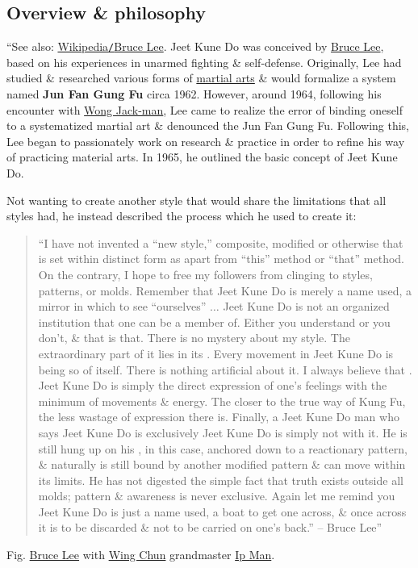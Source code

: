 \documentclass[oneside]{book}
\numberwithin{equation}{section}
\begin{document}
\subsection{Overview \& philosophy}
``See also: \href{https://en.wikipedia.org/wiki/Bruce_Lee}{Wikipedia\texttt{/}Bruce Lee}. Jeet Kune Do was conceived by \href{https://en.wikipedia.org/wiki/Bruce_Lee}{Bruce Lee}, based on his experiences in unarmed fighting \& self-defense. Originally, Lee had studied \& researched various forms of \href{https://en.wikipedia.org/wiki/Martial_arts}{martial arts} \& would formalize a system named \textbf{Jun Fan Gung Fu} circa 1962. However, around 1964, following his encounter with \href{https://en.wikipedia.org/wiki/Wong_Jack-man}{Wong Jack-man}, Lee came to realize the error of binding oneself to a systematized martial art \& denounced the Jun Fan Gung Fu. Following this, Lee began to passionately work on research \& practice in order to refine his way of practicing material arts. In 1965, he outlined the basic concept of Jeet Kune Do.

Not wanting to create another style that would share the limitations that all styles had, he instead described the process which he used to create it:
\begin{quotation}
	``I have not invented a ``new style,'' composite, modified or otherwise that is set within distinct form as apart from ``this'' method or ``that'' method. On the contrary, I hope to free my followers from clinging to styles, patterns, or molds. Remember that Jeet Kune Do is merely a name used, a mirror in which to see ``ourselves'' $\ldots$ Jeet Kune Do is not an organized institution that one can be a member of. Either you understand or you don't, \& that is that. There is no mystery about my style.  The extraordinary part of it lies in its . Every movement in Jeet Kune Do is being so of itself. There is nothing artificial about it. I always believe that . Jeet Kune Do is simply the direct expression of one's feelings with the minimum of movements \& energy. The closer to the true way of Kung Fu, the less wastage of expression there is. Finally, a Jeet Kune Do man who says Jeet Kune Do is exclusively Jeet Kune Do is simply not with it. He is still hung up on his , in this case, anchored down to a reactionary pattern, \& naturally is still bound by another modified pattern \& can move within its limits. He has not digested the simple fact that truth exists outside all molds; pattern \& awareness is never exclusive. Again let me remind you Jeet Kune Do is just a name used, a boat to get one across, \& once across it is to be discarded \& not to be carried on one's back.'' -- Bruce Lee''
\end{quotation}
\textsf{Fig. \href{https://en.wikipedia.org/wiki/Bruce_Lee}{Bruce Lee} with \href{https://en.wikipedia.org/wiki/Wing_Chun}{Wing Chun} grandmaster \href{https://en.wikipedia.org/wiki/Ip_Man}{Ip Man}}.
\end{document}
